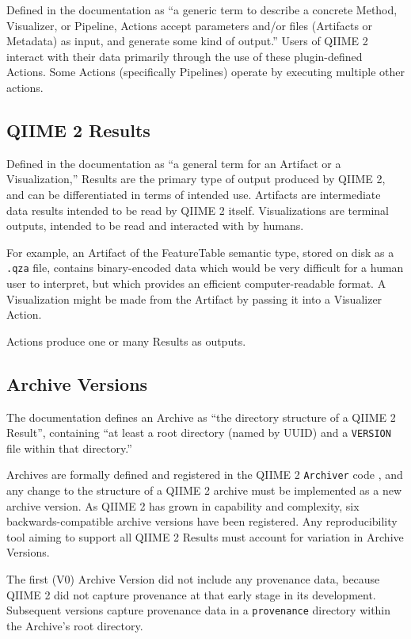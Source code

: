 Defined in the documentation as “a generic term to describe a concrete Method,
Visualizer, or Pipeline, Actions accept parameters and/or files (Artifacts or
Metadata) as input, and generate some kind of output.” Users of QIIME 2 interact
with their data primarily through the use of these plugin-defined Actions. Some
Actions (specifically Pipelines) operate by executing multiple other actions.

\subsection{QIIME 2 Results}

Defined in the documentation as “a general term for an Artifact or a
Visualization,” Results are the primary type of output produced by QIIME 2, and
can be differentiated in terms of intended use. Artifacts are intermediate data
results intended to be read by QIIME 2 itself. Visualizations are terminal
outputs, intended to be read and interacted with by humans. 

For example, an Artifact of the FeatureTable semantic type, stored on disk as a
\texttt{.qza} file, contains binary-encoded data which would be very difficult for a
human user to interpret, but which provides an efficient computer-readable
format. A Visualization might be made from the Artifact by passing it into a
Visualizer Action.

Actions produce one or many Results as outputs.

\subsection{Archive Versions}

The documentation defines an Archive as “the directory structure of a QIIME 2
Result”, containing “at least a root directory (named by UUID) and a \texttt{VERSION}
file within that directory.” 

Archives are formally defined and registered in the QIIME 2 \texttt{Archiver} code \parencite{qiime_2_development_team_qiime2_2016},
and any change to the structure of a QIIME 2 archive must be implemented as a new
archive version. As QIIME 2 has grown in capability and complexity, six
backwards-compatible archive versions have been registered. Any reproducibility
tool aiming to support all QIIME 2 Results must account for variation in Archive
Versions.

The first (V0) Archive Version did not include any provenance data, because
QIIME 2 did not capture provenance at that early stage in its development.
Subsequent versions capture provenance data in a \texttt{provenance} directory within the
Archive’s root directory.

